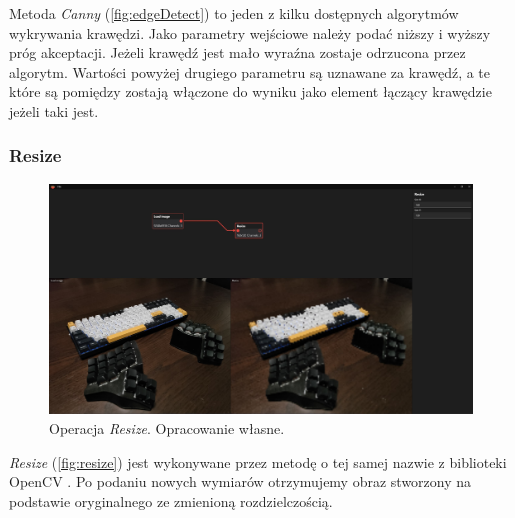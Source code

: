 Metoda \textit{Canny} \cite{canny} (\autoref{fig:edgeDetect}) to jeden z kilku dostępnych algorytmów wykrywania krawędzi. Jako parametry wejściowe należy podać niższy i wyższy próg akceptacji.
Jeżeli krawędź jest mało wyraźna zostaje odrzucona przez algorytm. 
Wartości powyżej drugiego parametru są uznawane za krawędź, a te które są pomiędzy zostają włączone do wyniku jako element łączący krawędzie jeżeli taki jest. 

\subsubsection{Resize}

\begin{figure}[H]
    \centering
    \includegraphics[width=1\linewidth]{images/Picture26.jpg}
    \caption{Operacja \textit{Resize}. Opracowanie własne.}
    \label{fig:resize}
\end{figure} 

\textit{Resize} (\autoref{fig:resize}) jest wykonywane przez metodę o tej samej nazwie z biblioteki OpenCV \cite{resize}. Po podaniu nowych wymiarów otrzymujemy obraz stworzony na podstawie oryginalnego ze zmienioną rozdzielczością.